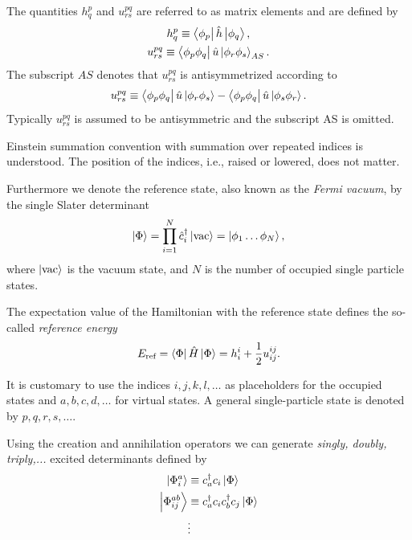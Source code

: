 \documentclass[aip,jcp,reprint,floatfix]{revtex4-1}
\newcommand{\refslat}{\Phi}
\newcommand{\oneten}{h}
\newcommand{\twoten}{u}
\newcommand{\onehamil}{\hat{\oneten}}
\newcommand{\twohamil}{\hat{\twoten}}
\newcommand{\ccr}[1]{\hat{c}_{#1}^{\dagger}}
\newcommand{\vac}{\text{vac}}
\begin{document}
    The quantities $h^p_q$ and $u^{pq}_{rs}$ are referred to as matrix elements and are defined by
    \begin{gather}
        \oneten^{p}_{q} \equiv \bra{\phi_p}\onehamil\ket{\phi_q}, \\
        \twoten^{pq}_{rs} \equiv \bra{\phi_p\phi_q}\twohamil\ket{\phi_r\phi_s}_{AS}.
    \end{gather}
    The subscript $AS$ denotes that $u^{pq}_{rs}$ is antisymmetrized according to
    \begin{align}
        \twoten^{pq}_{rs}
        \equiv
        \bra{\phi_p\phi_q}\twohamil\ket{\phi_r\phi_s}
        -
        \bra{\phi_p\phi_q}\twohamil\ket{\phi_s\phi_r}.
    \end{align}
    Typically $u^{pq}_{rs}$ is assumed to be antisymmetric and the subscript AS is omitted.
    
    Einstein summation convention with summation over repeated indices is understood.
    The position of the indices, i.e., raised or lowered, does not matter.
    
    Furthermore we denote the reference state, also known as the \emph{Fermi vacuum}, by the single Slater determinant
    \begin{align}
        \ket{\refslat}
        =
        \prod_{i = 1}^{N}\ccr{i}\ket{\vac}
        = \ket{\phi_1 \dots \phi_N},
        \label{eq:ref-state}
    \end{align}
    where $\ket{\vac}$ is the vacuum state, and $N$ is the number of occupied single particle states. 
    
    The expectation value of the Hamiltonian with the reference state defines the so-called \emph{reference energy}
    \begin{equation}
        E_\text{ref} = \bra{\Phi}\hat{H}\ket{\Phi} 
        = \oneten^{i}_{i} + \frac{1}{2} \twoten^{ij}_{ij}.
        \label{eq:ref-energy}
    \end{equation}
    
    It is customary to use the indices $i, j, k, l, \dots$ as placeholders for the occupied states and $a, b, c, d, \dots $ for virtual states. A general single-particle state is denoted by $p, q, r, s, \dots$.
    
    Using the creation and annihilation operators we can generate \emph{singly, doubly, triply,...} excited determinants defined by
    \begin{align}
        \ket{\Phi^a_i} &\equiv c_a^\dagger c_i \ket{\Phi} \\
        \ket{\Phi^{ab}_{ij}} &\equiv c_a^\dagger c_i c_b^\dagger c_j \ket{\Phi} \\
        &\vdots
    \end{align}
    
\end{document}
